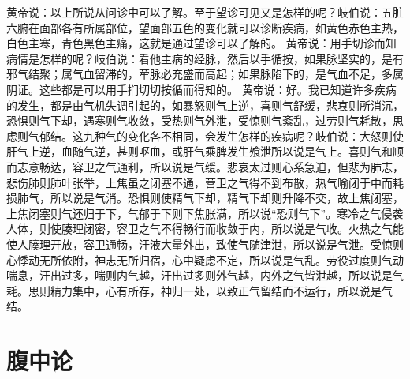 \documentclass[a4paper,12pt,UTF8,twoside]{ctexbook}
\begin{document}
黄帝说：以上所说从问诊中可以了解。至于望诊可见又是怎样的呢？岐伯说：五脏六腑在面部各有所属部位，望面部五色的变化就可以诊断疾病，如黄色赤色主热，白色主寒，青色黑色主痛，这就是通过望诊可以了解的。
黄帝说：用手切诊而知病情是怎样的呢？岐伯说：看他主病的经脉，然后以手循按，如果脉坚实的，是有邪气结聚；属气血留滞的，荦脉必充盛而高起；如果脉陷下的，是气血不足，多属阴证。这些都是可以用手扪切切按循而得知的。
黄帝说：好。我已知道许多疾病的发生，都是由气机失调引起的，如暴怒则气上逆，喜则气舒缓，悲哀则所消沉，恐惧则气下却，遇寒则气收敛，受热则气外泄，受惊则气紊乱，过劳则气耗散，思虑则气郁结。这九种气的变化各不相同，会发生怎样的疾病呢？岐伯说：大怒则使肝气上逆，血随气逆，甚则呕血，或肝气乘脾发生飧泄所以说是气上。喜则气和顺而志意畅达，容卫之气通利，所以说是气缓。悲哀太过则心系急迫，但悲为肺志，悲伤肺则肺叶张举，上焦虽之闭塞不通，营卫之气得不到布散，热气喻闭于中而耗损肺气，所以说是气消。恐惧则使精气下却，精气下却则升降不交，故上焦闭塞，上焦闭塞则气还归于下，气郁于下则下焦胀满，所以说“恐则气下”。寒冷之气侵袭人体，则使腠理闭密，容卫之气不得畅行而收敛于内，所以说是气收。火热之气能使人腠理开放，容卫通畅，汗液大量外出，致使气随津泄，所以说是气泄。受惊则心悸动无所依附，神志无所归宿，心中疑虑不定，所以说是气乱。劳役过度则气动喘息，汗出过多，喘则内气越，汗出过多则外气越，内外之气皆泄越，所以说是气耗。思则精力集中，心有所存，神归一处，以致正气留结而不运行，所以说是气结。

\chapter{腹中论}
\end{document}
